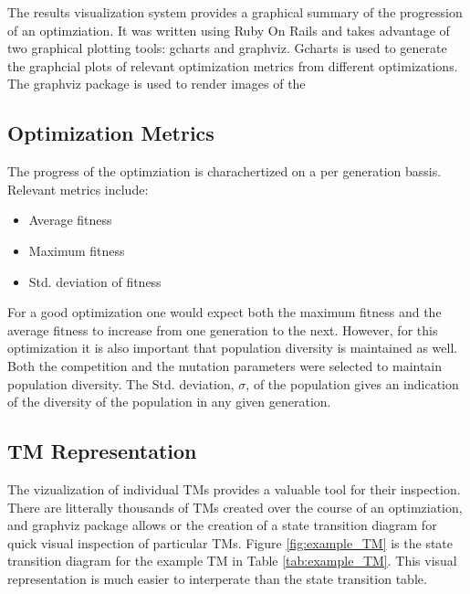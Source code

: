 The results visualization system provides a graphical summary of the progression of an optimziation. It was written using Ruby On Rails and takes advantage of two graphical plotting tools: gcharts and graphviz. Gcharts is used to generate the graphcial plots of relevant optimization metrics from different optimizations. The graphviz package is used to render images of the 

\subsection{Optimization Metrics}
The progress of the optimziation is charachertized on a per generation bassis. Relevant metrics include: 
\begin{itemize}
	\item Average fitness
	\item Maximum fitness
	\item Std. deviation of fitness
\end{itemize}

For a good optimization one would expect both the maximum fitness and the average fitness to increase from one generation to the next. However, for this optimization it is also important that population diversity is maintained as well. Both the competition and the mutation parameters were selected to maintain population diversity. The Std. deviation, $\sigma$, of the population gives an indication of the diversity of the population in any given generation. 

\subsection{TM Representation}
The vizualization of individual TMs provides a valuable tool for their inspection. There are litterally thousands of TMs created over the course of an optimziation, and graphviz package allows or the creation of a state transition diagram for quick visual inspection of particular TMs. Figure \ref{fig:example_TM} is the state transition diagram for the example TM in Table \ref{tab:example_TM}. This visual representation is much easier to interperate than the state transition table. 

